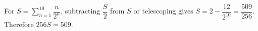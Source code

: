 For $S=\sum_{n=1}^{10}\dfrac{n}{2^n}$, subtracting $\dfrac{S}{2}$ from $S$ or telescoping gives $S=2-\dfrac{12}{2^{10}}=\dfrac{509}{256}$. Therefore $\boxed{256S=509}$.
